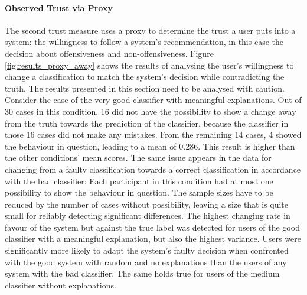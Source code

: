 \paragraph{Observed Trust via Proxy}
The second trust measure uses a proxy to determine the trust a user puts into a system: the willingness to follow a system's recommendation, in this case the decision about offensiveness and non-offensiveness. Figure \ref{fig:results_proxy_away} shows the results of analysing the user's willingness to change a classification to match the system's decision while contradicting the truth.\newline
The results presented in this section need to be analysed with caution. Consider the case of the very good classifier with meaningful explanations. Out of 30 cases in this condition, 16 did not have the possibility to show a change away from the truth towards the prediction of the classifier, because the classifier in those 16 cases did not make any mistakes. From the remaining 14 cases, 4 showed the behaviour in question, leading to a mean of 0.286. This result is higher than the other conditions' mean scores. The same issue appears in the data for changing from a faulty classification towards a correct classification in accordance with the bad classifier: Each participant in this condition had at most one possibility to show the behaviour in question. The sample sizes have to be reduced by the number of cases without possibility, leaving a size that is quite small for reliably detecting significant differences.\newline
The highest changing rate in favour of the system but against the true label was detected for users of the good classifier with a meaningful explanation, but also the highest variance. Users were significantly more likely to adapt the system's faulty decision when confronted with the good system with random and no explanations than the users of any system with the bad classifier. The same holds true for users of the medium classifier without explanations.\newline
